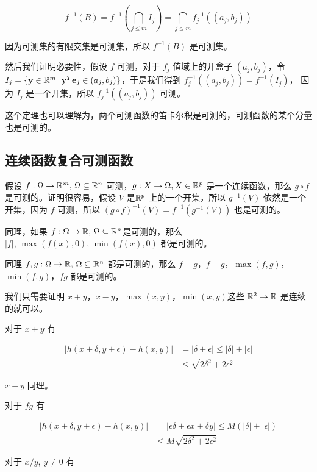 \[
f^{-1}(B) = f^{-1}(\bigcap_{j \le m}I_j) =\bigcap_{j \le m}f_j^{-1}((a_j, b_j))
\]

因为可测集的有限交集是可测集，所以 $ f^{-1}(B)$  是可测集。


然后我们证明必要性，假设 $f$ 可测，对于 $f_j$ 值域上的开盒子 $ (a_j, b_j)$，令
$I_j = \{ \mathbf{y} \in \mathbb{R}^m \,\vert\, \mathbf{y}^T \mathbf{e}_j \in (a_j, b_j)\}$，于是我们得到 $f_j^{-1}((a_j, b_j)) = f^{-1}(I_j)$，
因为 $I_j$ 是一个开集，所以 $f_j^{-1}((a_j, b_j))$ 可测。

这个定理也可以理解为，两个可测函数的笛卡尔积是可测的，可测函数的某个分量也是可测的。


\subsection{连续函数复合可测函数}

假设 $f: \Omega \to \mathbb{R}^m,\, \Omega \subseteq \mathbb{R}^n$ 可测，$g: X \to \Omega, X \in \mathbb{R}^p$ 是一个连续函数，那么 $g \circ f$ 是可测的。证明很容易，假设 $V$ 是$\mathbb{R}^p$ 上的一个开集，所以
$g^{-1}(V)$ 依然是一个开集，因为 $f$ 可测，所以 $ (g \circ f)^{-1}(V) = f^{-1}(g^{-1}(V))$ 也是可测的。

同理，如果 $f: \Omega\to \mathbb{R},\, \Omega \subseteq \mathbb{R}^n$是可测的，那么 $\lvert f \rvert,\, \max(f(x), 0), \, \min(f(x), 0)$ 都是可测的。

同理 $f, g: \Omega\to \mathbb{R},\, \Omega \subseteq \mathbb{R}^n$ 都是可测的，那么 $f +g$，$f-g$，$\max(f,g)$，$\min(f,g)$，$fg$ 都是可测的。

我们只需要证明 $x+y$，$x-y$，$\max(x,y)$，$\min(x,y)$这些 $\mathbb{R}^2 \to \mathbb{R}$ 是连续的就可以。

对于 $x+y$ 有 

\begin{align*}
\lvert h(x+\delta, y+\epsilon) - h(x,y) \rvert &= \lvert \delta + \epsilon \rvert \le \lvert \delta \rvert + \lvert \epsilon \rvert \\
& \le \sqrt{2\delta^2 + 2\epsilon^2}
\end{align*}

$x-y$ 同理。

对于 $fg$ 有

\begin{align*}
\lvert h(x+\delta, y+\epsilon) - h(x,y) \rvert &= \lvert \epsilon\delta + \epsilon x  + \delta y\rvert \le M(\lvert \delta \rvert + \lvert \epsilon \rvert) \\
& \le M\sqrt{2\delta^2 + 2\epsilon^2}
\end{align*}


对于 $x/y,\, y \ne 0$ 有

